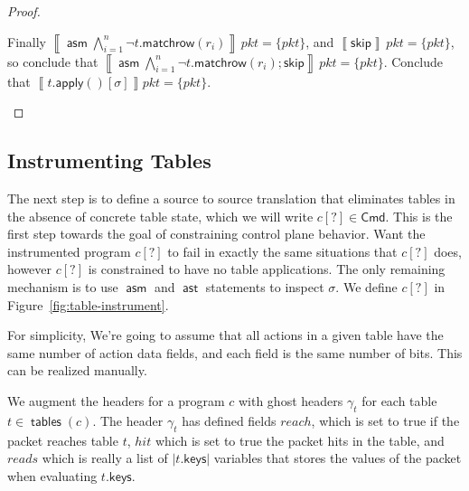 \documentclass{article}
\newcommand{\pkt}{\mathit{pkt}}
\newcommand{\denote}[1]{\left\llbracket#1\right\rrbracket}
\newcommand{\Cmd}{\mathsf{Cmd}}
\newcommand{\keys}{\mathsf{keys}}
\newcommand{\reach}{\mathit{\mathit{reach}}}
\newcommand{\hit}{\mathit{hit}}
\newcommand{\reads}{\mathit{reads}}
\newcommand{\assert}{\mathop{\mathsf{ast}}}
\newcommand{\assume}{\mathop{\mathsf{asm}}}
\newcommand{\apply}{\mathsf{apply}}
\newcommand{\SKIP}{\mathsf{skip}}
\newcommand{\instr}{[?]}
\newcommand{\matchrow}{\mathsf{matchrow}}
\newcommand{\tables}{\mathop{\mathsf{tables}}}
\theoremstyle{plain}
\theoremstyle{definition}
\theoremstyle{remark}
\begin{document}
\begin{proof}
\begin{enumerate}[align=left]
\begin{enumerate}
          Finally $\denote{\assume \bigwedge_{i=1}^n \neg
            t.\matchrow(r_i)}\,\pkt = \{\pkt\}$, and $\denote{\SKIP}\,\pkt
          =\{\pkt\}$, so conclude that $\denote{\assume \bigwedge_{i=1}^n \neg
            t.\matchrow(r_i);\SKIP}\,\pkt = \{\pkt\}$.
          Conclude that $\denote{t.\apply()[\sigma]}\pkt = \{pkt\}$.
      \end{enumerate}
  \end{enumerate}
\end{proof}




\subsection{Instrumenting Tables}

The next step is to define a source to source translation that eliminates tables
in the absence of concrete table state, which we will write $c\instr \in \Cmd$.
This is the first step towards the goal of constraining control plane behavior.
Want the instrumented program $c\instr$ to fail in exactly the same situations that
$c\instr$ does, however $c\instr$ is constrained to have no table applications.
The only remaining mechanism is to use $\assume$ and $\assert$ statements to
inspect $\sigma$. We define $c[?]$ in Figure~\ref{fig:table-instrument}.

For simplicity, We're going to assume that all actions in a given table have the
same number of action data fields, and each field is the same number of bits.
This can be realized manually.

We augment the headers for a program $c$ with ghost headers $\gamma_t$ for each
table $t \in \tables(c)$. The header $\gamma_t$ has defined fields
$\reach$, which is set to true if the packet reaches table $t$,
$\hit$ which is set to true the packet hits in the table, and
$\reads$ which is really a list of $|t.\keys|$ variables that stores the
values of the packet when evaluating $t.\keys$.
\end{document}

